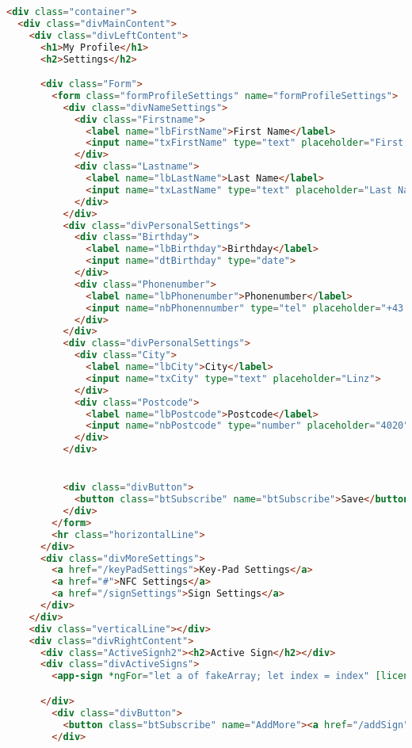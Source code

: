 \begin{lstlisting}[language=html, caption=Profil Komponente]
    <div class="container">
  <div class="divMainContent">
    <div class="divLeftContent">
      <h1>My Profile</h1>
      <h2>Settings</h2>

      <div class="Form">
        <form class="formProfileSettings" name="formProfileSettings">
          <div class="divNameSettings">
            <div class="Firstname">
              <label name="lbFirstName">First Name</label>
              <input name="txFirstName" type="text" placeholder="First Name">
            </div>
            <div class="Lastname">
              <label name="lbLastName">Last Name</label>
              <input name="txLastName" type="text" placeholder="Last Name">
            </div>
          </div>
          <div class="divPersonalSettings">
            <div class="Birthday">
              <label name="lbBirthday">Birthday</label>
              <input name="dtBirthday" type="date">
            </div>
            <div class="Phonenumber">
              <label name="lbPhonenumber">Phonenumber</label>
              <input name="nbPhonennumber" type="tel" placeholder="+43 660 123 123 12">
            </div>
          </div>
          <div class="divPersonalSettings">
            <div class="City">
              <label name="lbCity">City</label>
              <input name="txCity" type="text" placeholder="Linz">
            </div>
            <div class="Postcode">
              <label name="lbPostcode">Postcode</label>
              <input name="nbPostcode" type="number" placeholder="4020">
            </div>
          </div>


          <div class="divButton">
            <button class="btSubscribe" name="btSubscribe">Save</button>
          </div>
        </form>
        <hr class="horizontalLine">
      </div>
      <div class="divMoreSettings">
        <a href="/keyPadSettings">Key-Pad Settings</a>
        <a href="#">NFC Settings</a>
        <a href="/signSettings">Sign Settings</a>
      </div>
    </div>
    <div class="verticalLine"></div>
    <div class="divRightContent">
      <div class="ActiveSignh2"><h2>Active Sign</h2></div>
      <div class="divActiveSigns">
        <app-sign *ngFor="let a of fakeArray; let index = index" [licensename]="licensename"></app-sign>

      </div>
        <div class="divButton">
          <button class="btSubscribe" name="AddMore"><a href="/addSign">Add More</a></button>
        </div>


\end{lstlisting}
